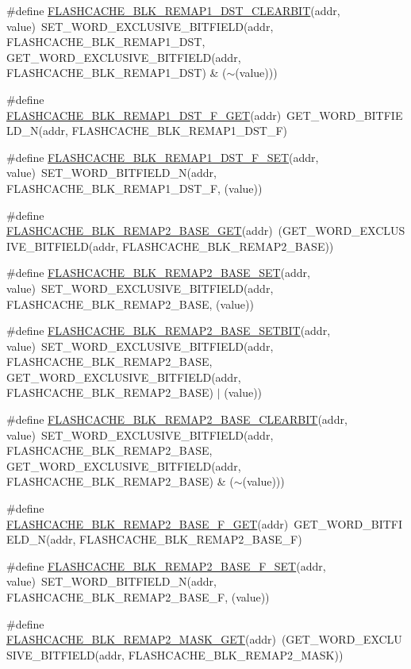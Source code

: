 \begin{DoxyCompactItemize}
\item 
\#define \hyperlink{a00549_aa3907d9fa83c915cdd7c03375c526f8d}{FLASHCACHE\_\-BLK\_\-REMAP1\_\-DST\_\-CLEARBIT}(addr, value)~SET\_\-WORD\_\-EXCLUSIVE\_\-BITFIELD(addr, FLASHCACHE\_\-BLK\_\-REMAP1\_\-DST, GET\_\-WORD\_\-EXCLUSIVE\_\-BITFIELD(addr, FLASHCACHE\_\-BLK\_\-REMAP1\_\-DST) \& ($\sim$(value)))
\item 
\#define \hyperlink{a00549_a4d7a4b8e16418ae140dbbaa7b9fef17a}{FLASHCACHE\_\-BLK\_\-REMAP1\_\-DST\_\-F\_\-GET}(addr)~GET\_\-WORD\_\-BITFIELD\_\-N(addr, FLASHCACHE\_\-BLK\_\-REMAP1\_\-DST\_\-F)
\item 
\#define \hyperlink{a00549_a8c7d9e96c221c7dd5452e87703a94b05}{FLASHCACHE\_\-BLK\_\-REMAP1\_\-DST\_\-F\_\-SET}(addr, value)~SET\_\-WORD\_\-BITFIELD\_\-N(addr, FLASHCACHE\_\-BLK\_\-REMAP1\_\-DST\_\-F, (value))
\item 
\#define \hyperlink{a00549_a62b7ba7c5ab7d5e25d3eaf257b9dc479}{FLASHCACHE\_\-BLK\_\-REMAP2\_\-BASE\_\-GET}(addr)~(GET\_\-WORD\_\-EXCLUSIVE\_\-BITFIELD(addr, FLASHCACHE\_\-BLK\_\-REMAP2\_\-BASE))
\item 
\#define \hyperlink{a00549_a73c53ffb3d29b13575a1f2e25f0c97d9}{FLASHCACHE\_\-BLK\_\-REMAP2\_\-BASE\_\-SET}(addr, value)~SET\_\-WORD\_\-EXCLUSIVE\_\-BITFIELD(addr, FLASHCACHE\_\-BLK\_\-REMAP2\_\-BASE, (value))
\item 
\#define \hyperlink{a00549_a990079e557f1fc0343d1a3eab014b1cf}{FLASHCACHE\_\-BLK\_\-REMAP2\_\-BASE\_\-SETBIT}(addr, value)~SET\_\-WORD\_\-EXCLUSIVE\_\-BITFIELD(addr, FLASHCACHE\_\-BLK\_\-REMAP2\_\-BASE, GET\_\-WORD\_\-EXCLUSIVE\_\-BITFIELD(addr, FLASHCACHE\_\-BLK\_\-REMAP2\_\-BASE) $|$ (value))
\item 
\#define \hyperlink{a00549_ac14360f98c8f48a3c0c1eb91523d99cc}{FLASHCACHE\_\-BLK\_\-REMAP2\_\-BASE\_\-CLEARBIT}(addr, value)~SET\_\-WORD\_\-EXCLUSIVE\_\-BITFIELD(addr, FLASHCACHE\_\-BLK\_\-REMAP2\_\-BASE, GET\_\-WORD\_\-EXCLUSIVE\_\-BITFIELD(addr, FLASHCACHE\_\-BLK\_\-REMAP2\_\-BASE) \& ($\sim$(value)))
\item 
\#define \hyperlink{a00549_ae21027801244a277643d7668ed7c4d26}{FLASHCACHE\_\-BLK\_\-REMAP2\_\-BASE\_\-F\_\-GET}(addr)~GET\_\-WORD\_\-BITFIELD\_\-N(addr, FLASHCACHE\_\-BLK\_\-REMAP2\_\-BASE\_\-F)
\item 
\#define \hyperlink{a00549_a4624f7099e42e482dfda928c25d40efb}{FLASHCACHE\_\-BLK\_\-REMAP2\_\-BASE\_\-F\_\-SET}(addr, value)~SET\_\-WORD\_\-BITFIELD\_\-N(addr, FLASHCACHE\_\-BLK\_\-REMAP2\_\-BASE\_\-F, (value))
\item 
\#define \hyperlink{a00549_a7031553464ff8b33d1a51c73dc9d6cd2}{FLASHCACHE\_\-BLK\_\-REMAP2\_\-MASK\_\-GET}(addr)~(GET\_\-WORD\_\-EXCLUSIVE\_\-BITFIELD(addr, FLASHCACHE\_\-BLK\_\-REMAP2\_\-MASK))

\end{DoxyCompactItemize}
